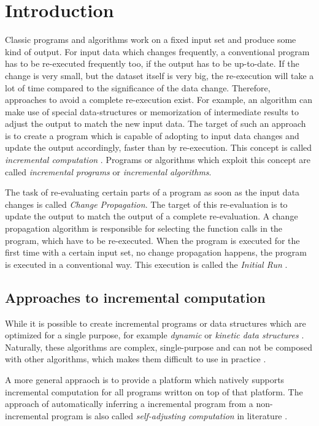 \section{Introduction}
Classic programs and algorithms work on a fixed input set and produce some kind of output. For input data which changes frequently, a conventional program has to be re-executed frequently too, if the output has to be up-to-date. If the change is very small, but the dataset itself is very big, the re-execution will take a lot of time compared to the significance of the data change. Therefore, approaches to avoid a complete re-execution exist. For example, an algorithm can make use of special data-structures or memorization of intermediate results to adjust the output to match the new input data. The target of such an approach is to create a program which is capable of adopting to input data changes and update the output accordingly, faster than by re-execution. This concept is called \textit{incremental computation} \cite{Ramalingam:IncrementalBibliography}. Programs or algorithms which exploit this concept are called \textit{incremental programs} or \textit{incremental algorithms}. 

The task of re-evaluating certain parts of a program as soon as the input data changes is called \textit{Change Propagation}. The target of this re-evaluation is to update the output to match the output of a complete re-evaluation. A change propagation algorithm is responsible for selecting the function calls in the program, which have to be re-executed. When the program is executed for the first time with a certain input set, no change propagation happens, the program is executed in a conventional way. This execution is called the \textit{Initial Run} \cite{Acar2005thesis}.

\subsection{Approaches to incremental computation}
While it is possible to create incremental programs or data structures which are optimized for a single purpose, for example \textit{dynamic} or \textit{kinetic data structures} \cite{Guibas98kineticdata}. Naturally, these algorithms are complex, single-purpose and can not be composed with other algorithms, which makes them difficult to use in practice \cite{Acar2005thesis}. 
 
A more general appraoch is to provide a platform which natively supports incremental computation for all programs writton on top of that platform. The approach of automatically inferring a incremental program from a non-incremental program is also called \textit{self-adjusting computation} in literature \cite{Harper2004} \cite{Acar2005thesis}. 

